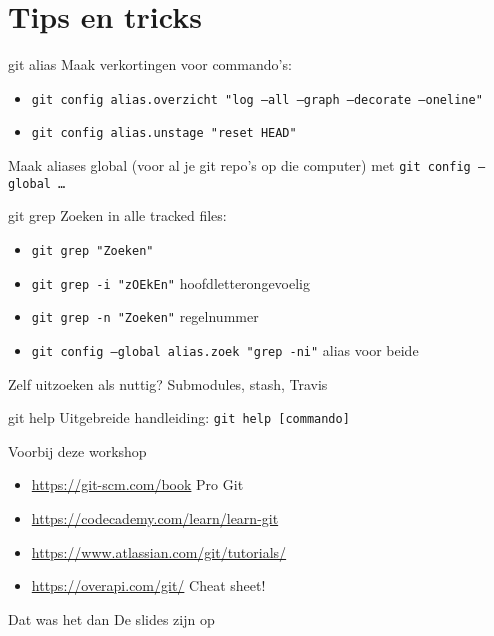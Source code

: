 \section[Tips]{Tips en tricks}

\begin{frame}{git alias}
	Maak verkortingen voor commando's:
	\begin{itemize}
		\item \texttt{git config alias.overzicht "log --all --graph --decorate --oneline"}
		\item \texttt{git config alias.unstage "reset HEAD"}
	\end{itemize}
	Maak aliases global (voor al je git repo's op die computer) met \texttt{git config --global \ldots}
\end{frame}

\begin{frame}{git grep}
	Zoeken in alle tracked files:
	\begin{itemize}
		\item \texttt{git grep "Zoeken"}
		\item \texttt{git grep -i "zOEkEn"} hoofdletterongevoelig
		\item \texttt{git grep -n "Zoeken"} regelnummer
		\item \texttt{git config --global alias.zoek "grep -ni"} alias voor beide
	\end{itemize}
\end{frame}

\begin{frame}{Zelf uitzoeken als nuttig?}
	Submodules, stash, Travis
\end{frame}

\begin{frame}{git help}
	Uitgebreide handleiding: \texttt{git help [commando]}
\end{frame}

\begin{frame}{Voorbij deze workshop}
	\begin{itemize}
		\item \url{https://git-scm.com/book} Pro Git
		\item \url{https://codecademy.com/learn/learn-git}
		\item \url{https://www.atlassian.com/git/tutorials/}
		\item \url{https://overapi.com/git/} Cheat sheet!
	\end{itemize}
\end{frame}

\begin{frame}{Dat was het dan}
	De slides zijn op
\end{frame}
